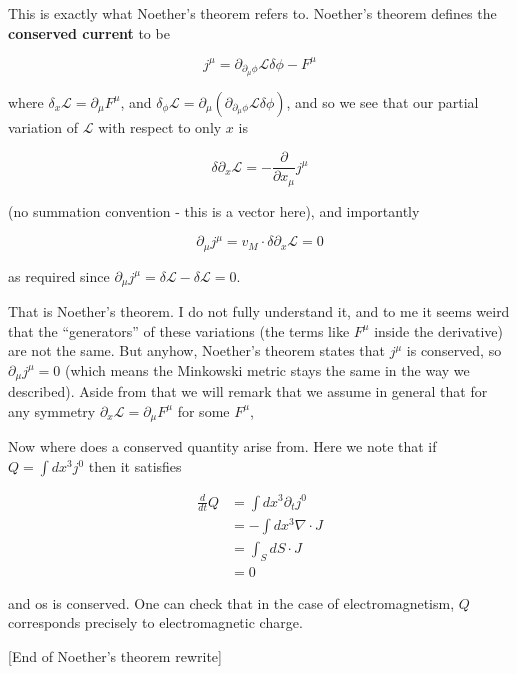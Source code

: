 \documentclass{article}
\theoremstyle{definition}
\begin{document}
This is exactly what Noether's theorem refers to. Noether's theorem defines the
\textbf{conserved current} to be

$$ j^\mu = \partial_{\partial_\mu \phi} \mathcal{L} \delta \phi - F^\mu $$

where $\delta_x \mathcal{L} = \partial_\mu F^\mu$, and $\delta_\phi \mathcal{L}
= \partial_\mu (\partial_{\partial_\mu \phi} \mathcal{L} \delta \phi) $, and so
we see that our partial variation of $\mathcal{L}$ with respect to only $x$ is

$$ \delta \partial_x \mathcal{L} = -\frac{\partial}{\partial x_\mu} j^\mu $$

(no summation convention - this is a vector here), and importantly

$$ \partial_\mu j^\mu = v_M \cdot \delta \partial_x \mathcal{L} = 0 $$

as required since $\partial_\mu j^\mu = \delta \mathcal{L} - \delta \mathcal{L}
= 0$.

That is Noether's theorem. I do not fully understand it, and to me it seems
weird that the ``generators'' of these variations (the terms like $F^\mu$ inside
the derivative) are not the same. But anyhow, Noether's theorem states that
$j^\mu$ is conserved, so $\partial_\mu j^\mu = 0$ (which means the Minkowski
metric stays the same in the way we described). Aside from that we will remark
that we assume in general that for any symmetry $\partial_x \mathcal{L} =
\partial_\mu F^\mu$ for some $F^\mu$,

Now where does a conserved quantity arise from. Here we note that if $Q = \int
dx^3 j^0$ then it satisfies

\begin{align*}
  \frac{d}{dt} Q
  &= \int dx^3 \partial_t j^0 \\
  &= - \int dx^3 \nabla \cdot J \\
  &= \int_S dS \cdot J \\
  &= 0
\end{align*}

and os is conserved. One can check that in the case of electromagnetism, $Q$
corresponds precisely to electromagnetic charge.

[End of Noether's theorem rewrite]
\end{document}
